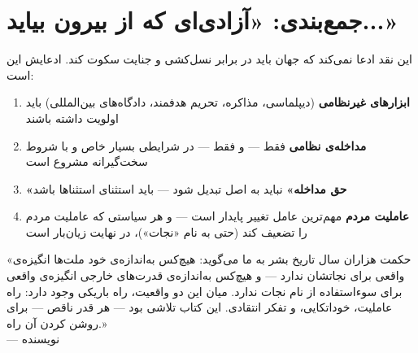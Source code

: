 \section{جمع‌بندی: «آزادی‌ای که از بیرون بیاید...»}
\label{sec:app-b-conclusion}

این نقد ادعا نمی‌کند که جهان باید در برابر نسل‌کشی و جنایت سکوت کند. ادعایش این است:

\begin{enumerate}
\item \textbf{ابزارهای غیرنظامی} (دیپلماسی، مذاکره، تحریم هدفمند، دادگاه‌های بین‌المللی) باید اولویت داشته باشند
\item \textbf{مداخله‌ی نظامی} فقط — و فقط — در شرایطی بسیار خاص و با شروط سخت‌گیرانه مشروع است
\item \textbf{«حق مداخله»} نباید به اصل تبدیل شود — باید استثنای استثناها باشد
\item \textbf{عاملیت مردم} مهم‌ترین عامل تغییر پایدار است — و هر سیاستی که عاملیت مردم را تضعیف کند (حتی به نام «نجات»)، در نهایت زیان‌بار است
\end{enumerate}

\begin{tcolorbox}[quotebox, title={سخن پایانی}]
«حکمت هزاران سال تاریخ بشر به ما می‌گوید: هیچ‌کس به‌اندازه‌ی خود ملت‌ها انگیزه‌ی واقعی برای نجاتشان ندارد — و هیچ‌کس به‌اندازه‌ی قدرت‌های خارجی انگیزه‌ی واقعی برای سوءاستفاده از نام نجات ندارد. میان این دو واقعیت، راه باریکی وجود دارد: راه عاملیت، خوداتکایی، و تفکر انتقادی. این کتاب تلاشی بود — هر قدر ناقص — برای روشن کردن آن راه.»\\
— نویسنده
\end{tcolorbox}

\cleardoublepage